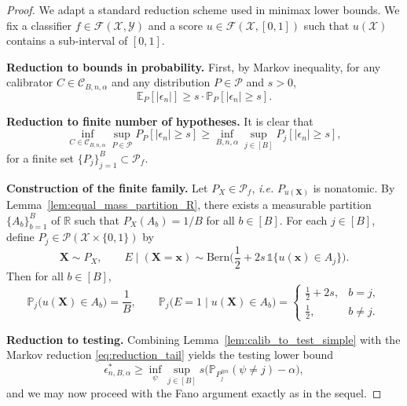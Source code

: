 \documentclass{article}
\theoremstyle{plain}
\theoremstyle{definition}
\theoremstyle{remark}
\begin{document}
\begin{proof}

    We adapt a standard reduction scheme \cite{Tsybakov2009IntroNonparametric} used in minimax lower bounds. We fix a classifier $f \in \mathcal{F}(\mathcal{X}, \mathcal{Y})$ and a score $u \in \mathcal{F}(\mathcal{X}, [0,1])$ such that $u(\mathcal{X})$ contains a sub-interval of $[0,1]$.
    
    \textbf{Reduction to bounds in probability.} First, by Markov inequality, for any calibrator $C\in \mathcal{C}_{B,n,\alpha}$ and any distribution $P \in \mathcal{P}$ and $s >0$,
    \begin{equation}
        \label{eq:reduction_tail}
            \mathbb E_P\!\left[ |\epsilon_n|\right] \geq  s \cdot \mathbb P_P\!\left[|\epsilon_n| \geq s\right].
    \end{equation}

    \textbf{Reduction to finite number of hypotheses.}
    It is clear that
    $$
    \inf_{C \in \mathcal{C}_{B,n, \alpha}} \sup_{P \in \mathcal{P}} P_P\!\left[|\epsilon_n| \geq s\right] \geq \inf_{B,n, \alpha} \sup_{j \in [B]} P_j\!\left[|\epsilon_n| \geq s\right],
    $$
    for a finite set $\{ P_j\}_{j=1}^B \subset \mathcal{P}_f$. 

  \textbf{Construction of the finite family.}
Let $P_X \in \mathcal{P}_f$, \textit{i.e.} $P_{u(\mathbf X)}$ is nonatomic.
By Lemma~\ref{lem:equal_mass_partition_R}, there exists a measurable partition
$\{A_b\}_{b=1}^B$ of $\mathbb R$ such that $P_X(A_b)=1/B$ for all $b\in[B]$.
For each $j\in[B]$, define $P_j\in\mathcal P(\mathcal X\times\{0,1\})$ by
\[
\mathbf X\sim P_X,\qquad
E\mid(\mathbf X=\mathbf x)\sim \mathrm{Bern}\!\Big(\frac12+2s\,\mathds 1\{u(\mathbf x)\in A_j\}\Big).
\]
Then for all $b\in[B]$,
\[
\mathbb P_j\big(u(\mathbf X)\in A_b\big)=\frac1B,
\qquad
\mathbb P_j\big(E=1\mid u(\mathbf X)\in A_b\big)
=
\begin{cases}
\frac12+2s,& b=j,\\[2pt]
\frac12,& b\neq j.
\end{cases}
\]

\textbf{Reduction to testing.}
Combining Lemma~\ref{lem:calib_to_test_simple} with the Markov reduction \eqref{eq:reduction_tail}
yields the testing lower bound
\[
\epsilon^*_{n,B,\alpha}
\ge
\inf_{\psi}\sup_{j\in[B]} s\Big(\mathbb P_{P_j^{\otimes n}}(\psi\neq j)-\alpha\Big),
\]
and we may now proceed with the Fano argument exactly as in the sequel.


\end{proof}
\end{document}
